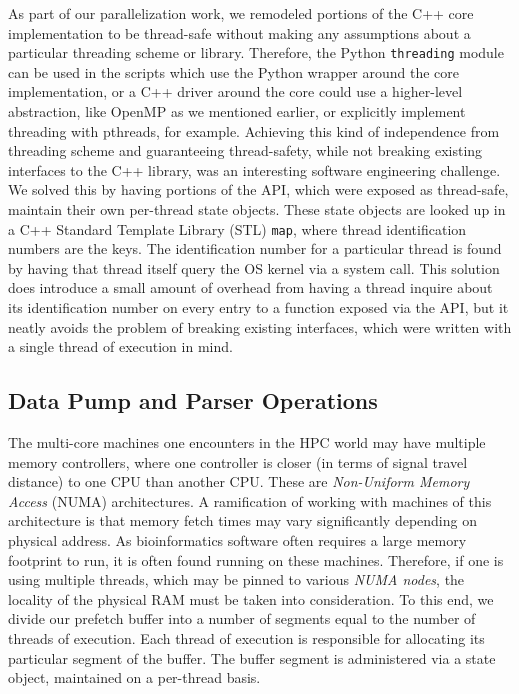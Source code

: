 \documentclass{article}
\begin{document}
As part of our parallelization work, we remodeled portions of the C++ core
implementation to be thread-safe without making any assumptions about a
particular threading scheme or library. Therefore, the Python
\texttt{threading} module can be used in the scripts which use the Python
wrapper around the core implementation, or a C++ driver around the core could
use a higher-level abstraction, like OpenMP as we mentioned earlier, or
explicitly implement threading with pthreads, for example. Achieving this kind
of independence from threading scheme and guaranteeing thread-safety, while not
breaking existing interfaces to the C++ library, was an interesting software
engineering challenge. We solved this by having portions of the API, which were
exposed as thread-safe, maintain their own per-thread state objects. These
state objects are looked up in a C++ Standard Template Library (STL)
\texttt{map}, where thread identification numbers are the keys. The
identification number for a particular thread is found by having that thread
itself query the OS kernel via a system call. This solution does introduce a
small amount of overhead from having a thread inquire about its identification
number on every entry to a function exposed via the API, but it neatly avoids
the problem of breaking existing interfaces, which were written with a single
thread of execution in mind.

\subsection{Data Pump and Parser Operations}

The multi-core machines one encounters in the HPC world may have multiple
memory controllers, where one controller is closer (in terms of signal travel
distance) to one CPU than another CPU. These are \textit{Non-Uniform Memory
Access} (NUMA) architectures. A ramification of working with machines of this
architecture is that memory fetch times may vary significantly depending on
physical address. As bioinformatics software often requires a large memory
footprint to run, it is often found running on these machines. Therefore, if
one is using multiple threads, which may be pinned to various \textit{NUMA
nodes}, the locality of the physical RAM must be taken into consideration. To
this end, we divide our prefetch buffer into a number of segments equal to the
number of threads of execution. Each thread of execution is responsible for
allocating its particular segment of the buffer. The buffer segment is
administered via a state object, maintained on a per-thread basis.
\end{document}
